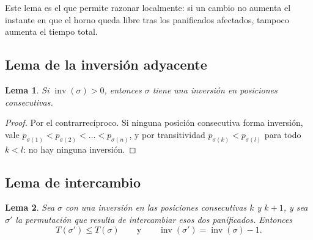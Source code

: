 \documentclass[11pt,a4paper]{article}
\theoremstyle{plain}
\newtheorem{lema}{Lema}
\theoremstyle{definition}
\theoremstyle{remark}
\newcommand{\inv}{\operatorname{inv}}
\begin{document}
Este lema es el que permite razonar localmente: si un cambio no aumenta el
instante en que el horno queda libre tras los panificados afectados, tampoco
aumenta el tiempo total.

\subsection*{Lema de la inversión adyacente}

\begin{lema}\label{lema:adyacente}
Si $\inv(\sigma) > 0$, entonces $\sigma$ tiene una inversión en posiciones
consecutivas.
\end{lema}

\begin{proof}
Por el contrarrecíproco. Si ninguna posición consecutiva forma inversión, vale
$p_{\sigma(1)} < p_{\sigma(2)} < \dots < p_{\sigma(n)}$, y por transitividad
$p_{\sigma(k)} < p_{\sigma(l)}$ para todo $k < l$: no hay ninguna inversión.
\end{proof}

\subsection*{Lema de intercambio}

\begin{lema}\label{lema:intercambio}
Sea $\sigma$ con una inversión en las posiciones consecutivas $k$ y $k+1$, y sea
$\sigma'$ la permutación que resulta de intercambiar esos dos panificados.
Entonces
\[
  T(\sigma') \leq T(\sigma)
  \qquad\text{y}\qquad
  \inv(\sigma') = \inv(\sigma) - 1 .
\]
\end{lema}
\end{document}
